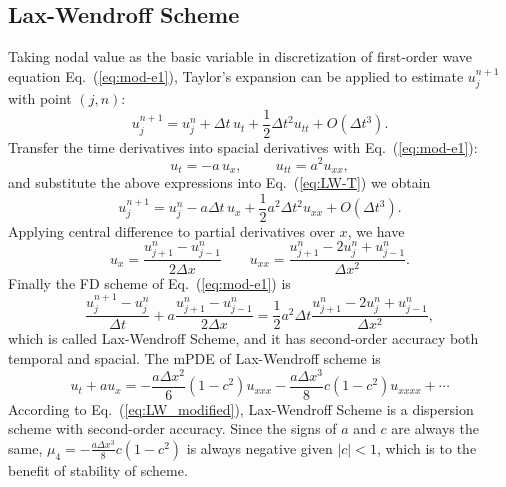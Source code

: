 \documentclass[]{article}
\def\abs#1{\left|#1\right|}
\begin{document}
\subsection{Lax-Wendroff Scheme} \label{sec:lax-wendroff-scheme}

Taking nodal value as the basic variable in discretization of first-order 
wave equation Eq.~(\ref{eq:mod-e1}), Taylor's expansion can be
applied to estimate $u_j^{n+1}$ with point $(j,n)$:
\begin{equation}
u_j^{n+1}=u_j^n+\Delta t\,u_t +\frac{1}{2}\Delta t^2 u_{tt}+O(\Delta t^3).
\label{eq:LW-T} 
\end{equation}
Transfer the time derivatives into spacial derivatives with
Eq.~(\ref{eq:mod-e1}):
\begin{equation*}
u_t=-a\, u_x,\hspace{1cm} u_{tt} = a^2 u_{xx},
\end{equation*}
and substitute the above expressions into Eq.~(\ref{eq:LW-T}) we
obtain
\begin{equation}
u_j^{n+1}=u_j^n-a\Delta t\, u_x +\frac{1}{2}a^2\Delta t^2 u_{xx}+O(\Delta t^3).
\label{eq:LW-T1} 
\end{equation}
Applying central difference to partial derivatives over $x$, we have
\begin{equation*}
u_x=\dfrac{u_{j+1}^n-u_{j-1}^n}{2\Delta x} \qquad
u_{xx}=\dfrac{u_{j+1}^n-2u_j^n+u_{j-1}^n}{\Delta x^2}.
\end{equation*}
Finally the FD scheme of Eq.~(\ref{eq:mod-e1}) is
\begin{equation*}
\label{eq:LW} \dfrac{u_{j}^{n+1}-u_{j}^n}{\Delta
t}+a\dfrac{u_{j+1}^n-u_{j-1}^n}{2\Delta x} =\dfrac{1}{2}a^2\Delta
t\dfrac{u_{j+1}^n-2u_j^n+u_{j-1}^n}{\Delta x^2},
\end{equation*}
which is called Lax-Wendroff Scheme, and it has second-order accuracy
both temporal and spacial. The mPDE of Lax-Wendroff
scheme is
\begin{equation}
u_t+au_x=-\frac{a\Delta x^2}{6}(1-c^2)u_{xxx} -\frac{a\Delta x^3}{8}c(1-c^2)u_{xxxx}+\cdots
\label{eq:LW_modified}
\end{equation}
According to Eq.~(\ref{eq:LW_modified}), Lax-Wendroff Scheme is a
dispersion scheme with second-order accuracy. Since the signs of $a$
and $c$ are always the same, $\mu_4=-\frac{a\Delta x^3}{8}c(1-c^2)$ is
always negative given $\abs{c} < 1$, which is to the benefit of
stability of scheme.
\end{document}
